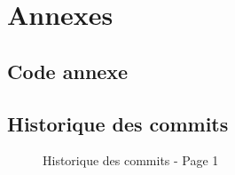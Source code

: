 \documentclass [a4 paper,11pt]{report}
\begin{document}
\chapter{Annexes}

\section{Code annexe}


\section{Historique des commits}

\begin{center}

  \begin{figure}[h!]
  \noindent{}
  \caption{Historique des commits - Page 1}
  \end{figure}


\end{center}
\end{document}
